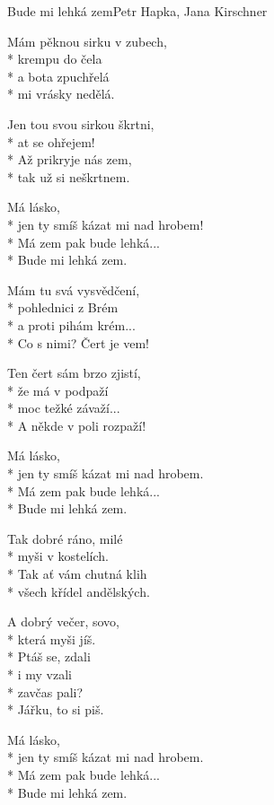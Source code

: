 \documentclass[10.5pt]{book}
\begin{document}
\begin{poem}{Bude mi lehká zem}{Petr Hapka, Jana Kirschner}

\settowidth{\versewidth}{jen ty smíš kázat mi nad hrobem.}

Mám pěknou sirku v zubech,\\*
krempu do čela\\*
a bota zpuchřelá\\*
mi vrásky nedělá.

Jen tou svou sirkou škrtni,\\*
at se ohřejem!\\*
Až prikryje nás zem,\\*
tak už si neškrtnem.

Má lásko,\\*
jen ty smíš kázat mi nad hrobem!\\*
Má zem pak bude lehká...\\*
Bude mi lehká zem.

Mám tu svá vysvědčení,\\*
pohlednici z Brém\\*
a proti pihám krém...\\*
Co s nimi? Čert je vem!

Ten čert sám brzo zjistí,\\*
že má v podpaží\\*
moc težké závaží...\\*
A někde v poli rozpaží!

Má lásko,\\*
jen ty smíš kázat mi nad hrobem.\\*
Má zem pak bude lehká...\\*
Bude mi lehká zem.

Tak dobré ráno, milé\\*
myši v kostelích.\\*
Tak ať vám chutná klih\\*
všech křídel andělských.

A dobrý večer, sovo,\\*
která myši jíš.\\*
Ptáš se, zdali\\*
i my vzali\\*
zavčas pali?\\*
Jářku, to si piš.

Má lásko,\\*
jen ty smíš kázat mi nad hrobem.\\*
Má zem pak bude lehká...\\*
Bude mi lehká zem.


\end{poem}
\end{document}
